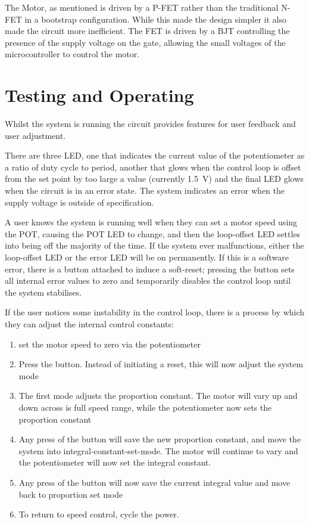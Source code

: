 \documentclass[a4paper]{article}
\begin{document}
The Motor, as mentioned is driven by a P-FET rather than the traditional N-FET in a bootstrap configuration. While this made the design simpler it also made the circuit more inefficient. The FET is driven by a BJT controlling the presence of the supply voltage on the gate, allowing the small voltages of the microcontroller to control the motor.




\section{Testing and Operating}
Whilst the system is running the circuit provides features for user feedback and user adjustment.

There are three LED, one that indicates the current value of the potentiometer as a ratio of duty cycle to period, another that glows when the control loop is offset from the set point by too large a value (currently \SI{1.5}{\volt}) and the final LED glows when the circuit is in an error state. The system indicates an error when the supply voltage is outside of specification. 

A user knows the system is running well when they can set a motor speed using the POT, causing the POT LED to change, and then the loop-offset LED settles into being off the majority of the time. If the system ever malfunctions, either the loop-offset LED or the error LED will be on permanently. If this is a software error, there is a button attached to induce a soft-reset; pressing the button sets all internal error values to zero and temporarily disables the control loop until the system stabilises.

If the user notices some instability in the control loop, there is a process by which they can adjust the internal control constants:
\begin{enumerate}
    \item set the motor speed to zero via the potentiometer
    \item Press the button. Instead of initiating a reset, this will now adjust the system mode
    \item The first mode adjusts the proportion constant. The motor will vary up and down across is full speed range, while the potentiometer now sets the proportion constant
    \item Any press of the button will save the new proportion constant, and move the system into integral-constant-set-mode. The motor will continue to vary and the potentiometer will now set the integral constant.
    \item Any press of the button will now save the current integral value and move back to proportion set mode
    \item To return to speed control, cycle the power.
\end{enumerate}
\end{document}
